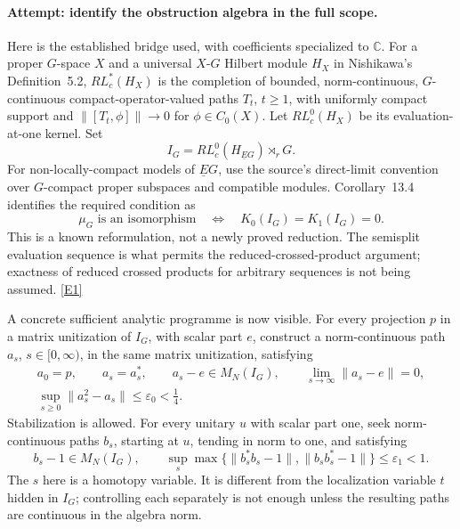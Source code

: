 \documentclass[11pt]{article}
\newcommand{\C}{\mathbb{C}}
\newcommand{\eref}[2]{\hyperlink{extra:#1:#2}{[E#2]}}
\begin{document}
\paragraph{Attempt: identify the obstruction algebra in the full scope.}
Here is the established bridge used, with coefficients specialized to
$\C$. For a proper $G$-space $X$ and a universal $X$-$G$ Hilbert module
$H_X$ in Nishikawa's Definition~5.2, $RL_c^*(H_X)$ is the completion of
bounded, norm-continuous, $G$-continuous compact-operator-valued
paths $T_t$, $t\ge1$,
with uniformly compact support and
$\|[T_t,\phi]\|\to0$ for $\phi\in C_0(X)$.
Let $RL_c^0(H_X)$ be its evaluation-at-one kernel. Set
\begin{equation}\label{ra:1479:kernel}
 I_G=RL_c^0(H_{\underline EG})\rtimes_r G.
\end{equation}
For non-locally-compact models of $\underline EG$, use the source's
direct-limit convention over $G$-compact proper subspaces and compatible
modules. Corollary~13.4 identifies the required condition as
\begin{equation}\label{ra:1479:obstruction}
 \mu_G\text{ is an isomorphism}
 \quad\Longleftrightarrow\quad K_0(I_G)=K_1(I_G)=0.
\end{equation}
This is a known reformulation, not a newly proved reduction. The
semisplit evaluation sequence is what permits the reduced-crossed-product
argument; exactness of reduced crossed products for arbitrary sequences
is not being assumed. \eref{1479}{1}

A concrete sufficient analytic programme is now visible. For every
projection $p$ in a matrix unitization of $I_G$, with scalar part $e$,
construct a norm-continuous path $a_s$, $s\in[0,\infty)$, in the same
matrix unitization, satisfying
\begin{equation}\label{ra:1479:program0}
 \begin{gathered}
 a_0=p,\qquad a_s=a_s^*,\qquad a_s-e\in M_N(I_G),\qquad
 \lim_{s\to\infty}\|a_s-e\|=0,\\
 \sup_{s\ge0}\|a_s^2-a_s\|\le\varepsilon_0<\tfrac14.
 \end{gathered}
\end{equation}
Stabilization is allowed. For every unitary $u$ with scalar part one,
seek norm-continuous paths $b_s$, starting at $u$, tending in norm
to one, and satisfying
\begin{equation}\label{ra:1479:program1}
 b_s-1\in M_N(I_G),\qquad
 \sup_s\max\{\|b_s^*b_s-1\|,\|b_sb_s^*-1\|\}
 \le\varepsilon_1<1.
\end{equation}
The $s$ here is a homotopy variable. It is different from the localization
variable $t$ hidden in $I_G$; controlling each separately is not enough
unless the resulting paths are continuous in the algebra norm.
\end{document}
